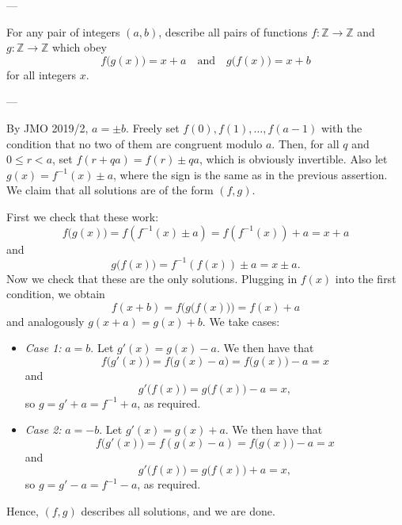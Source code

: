 
---

For any pair of integers $(a,b)$, describe all pairs of functions $f:\mathbb Z\to\mathbb Z$ and $g:\mathbb Z\to\mathbb Z$ which obey \[f\big(g(x)\big)=x+a\quad\text{and}\quad g\big(f(x)\big)=x+b\]
for all integers $x$.

---

By JMO 2019/2, $a=\pm b$. Freely set $f(0),f(1),\ldots,f(a-1)$ with the condition that no two of them are congruent modulo $a$. Then, for all $q$ and $0\le r<a$, set $f(r+qa)=f(r)\pm qa$, which is obviously invertible. Also let $g(x)=f^{-1}(x)\pm a$, where the sign is the same as in the previous assertion. We claim that all solutions are of the form $(f,g)$.

First we check that these work: \[f\big(g(x)\big)=f\left(f^{-1}(x)\pm a\right)=f\left(f^{-1}(x)\right)+a=x+a\]
and \[g\big(f(x)\big)=f^{-1}\left(f(x)\right)\pm a=x\pm a.\]
Now we check that these are the only solutions. Plugging in $f(x)$ into the first condition, we obtain \[f(x+b)=f\Big(g\big(f(x)\big)\Big)=f(x)+a\]
and analogously $g(x+a)=g(x)+b$. We take cases:
\begin{itemize}
    \item \textit{Case 1:} $a=b$. Let $g'(x)=g(x)-a$. We then have that \[f\big(g'(x)\big)=f\big(g(x)-a\big)=f\big(g(x)\big)-a=x\]
        and \[g'\big(f(x)\big)=g\big(f(x)\big)-a=x,\]
so $g=g'+a=f^{-1}+a$, as required.
\item \textit{Case 2:} $a=-b$. Let $g'(x)=g(x)+a$. We then have that \[f\big(g'(x)\big)=f(g(x)-a)=f\big(g(x)\big)-a=x\]
    and \[g'\big(f(x)\big)=g\big(f(x)\big)+a=x,\]
so $g=g'-a=f^{-1}-a$, as required.
\end{itemize}
Hence, $(f,g)$ describes all solutions, and we are done.

